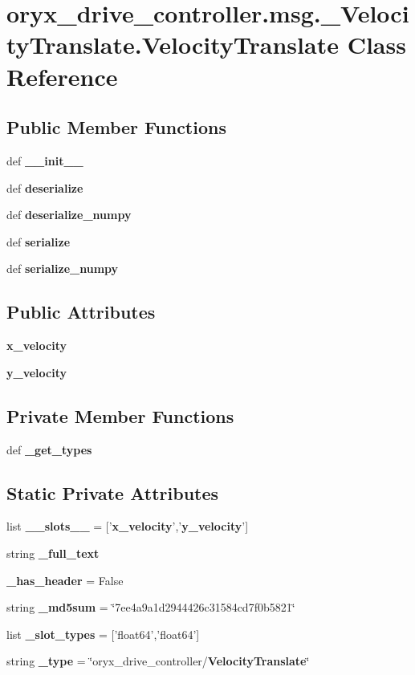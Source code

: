\section{oryx\-\_\-drive\-\_\-controller.\-msg.\-\_\-\-Velocity\-Translate.\-Velocity\-Translate \-Class \-Reference}
\label{classoryx__drive__controller_1_1msg_1_1__VelocityTranslate_1_1VelocityTranslate}
\subsection*{\-Public \-Member \-Functions}
\begin{DoxyCompactItemize}
\item 
def {\bf \-\_\-\-\_\-init\-\_\-\-\_\-}
\item 
def {\bf deserialize}
\item 
def {\bf deserialize\-\_\-numpy}
\item 
def {\bf serialize}
\item 
def {\bf serialize\-\_\-numpy}
\end{DoxyCompactItemize}
\subsection*{\-Public \-Attributes}
\begin{DoxyCompactItemize}
\item 
{\bf x\-\_\-velocity}
\item 
{\bf y\-\_\-velocity}
\end{DoxyCompactItemize}
\subsection*{\-Private \-Member \-Functions}
\begin{DoxyCompactItemize}
\item 
def {\bf \-\_\-get\-\_\-types}
\end{DoxyCompactItemize}
\subsection*{\-Static \-Private \-Attributes}
\begin{DoxyCompactItemize}
\item 
list {\bf \-\_\-\-\_\-slots\-\_\-\-\_\-} = ['{\bf x\-\_\-velocity}','{\bf y\-\_\-velocity}']
\item 
string {\bf \-\_\-full\-\_\-text}
\item 
{\bf \-\_\-has\-\_\-header} = \-False
\item 
string {\bf \-\_\-md5sum} = \char`\"{}7ee4a9a1d2944426c31584cd7f0b5821\char`\"{}
\item 
list {\bf \-\_\-slot\-\_\-types} = ['float64','float64']
\item 
string {\bf \-\_\-type} = \char`\"{}oryx\-\_\-drive\-\_\-controller/{\bf \-Velocity\-Translate}\char`\"{}
\end{DoxyCompactItemize}


